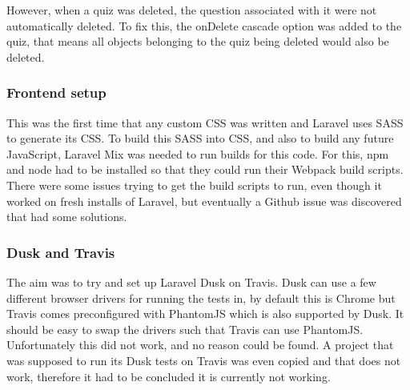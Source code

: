 However, when a quiz was deleted, the question associated with it were not automatically deleted. To fix this, the onDelete cascade option was added to the quiz, that means all objects belonging to the quiz being deleted would also be deleted.
\subsubsection{Frontend setup}
This was the first time that any custom CSS was written and Laravel uses SASS to generate its CSS. To build this SASS into CSS, and also to build any future JavaScript, Laravel Mix was needed to run builds for this code. For this, npm and node had to be installed so that they could run their Webpack build scripts. There were some issues trying to get the build scripts to run, even though it worked on fresh installs of Laravel, but eventually a Github issue was discovered that had some solutions\cite{broken-mix}.
\subsubsection{Dusk and Travis}
The aim was to try and set up Laravel Dusk on Travis. Dusk can use a few different browser drivers for running the tests in, by default this is Chrome but Travis comes preconfigured with PhantomJS which is also supported by Dusk. It should be easy to swap the drivers such that Travis can use PhantomJS. Unfortunately this did not work, and no reason could be found. A project that was supposed to run its Dusk tests on Travis was even copied and that does not work, therefore it had to be concluded it is currently not working.
\newpage
